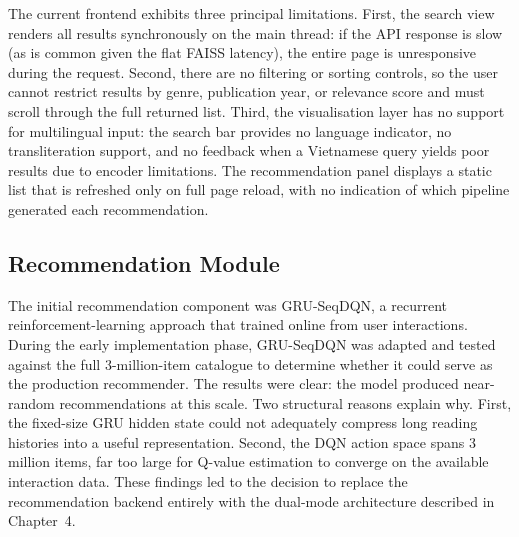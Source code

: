 The current frontend exhibits three principal limitations.
First, the search view renders all results synchronously on the main thread: if the API response is slow (as is common given the flat FAISS latency), the entire page is unresponsive during the request.
Second, there are no filtering or sorting controls, so the user cannot restrict results by genre, publication year, or relevance score and must scroll through the full returned list.
Third, the visualisation layer has no support for multilingual input: the search bar provides no language indicator, no transliteration support, and no feedback when a Vietnamese query yields poor results due to encoder limitations.
The recommendation panel displays a static list that is refreshed only on full page reload, with no indication of which pipeline generated each recommendation.

\subsection{Recommendation Module}
\label{sec:rec_analysis}

The initial recommendation component was GRU-SeqDQN, a recurrent reinforcement-learning approach that trained online from user interactions.
During the early implementation phase, GRU-SeqDQN was adapted and tested against the full 3-million-item catalogue to determine whether it could serve as the production recommender.
The results were clear: the model produced near-random recommendations at this scale.
Two structural reasons explain why.
First, the fixed-size GRU hidden state could not adequately compress long reading histories into a useful representation.
Second, the DQN action space spans 3 million items, far too large for Q-value estimation to converge on the available interaction data.
These findings led to the decision to replace the recommendation backend entirely with the dual-mode architecture described in Chapter~4.

